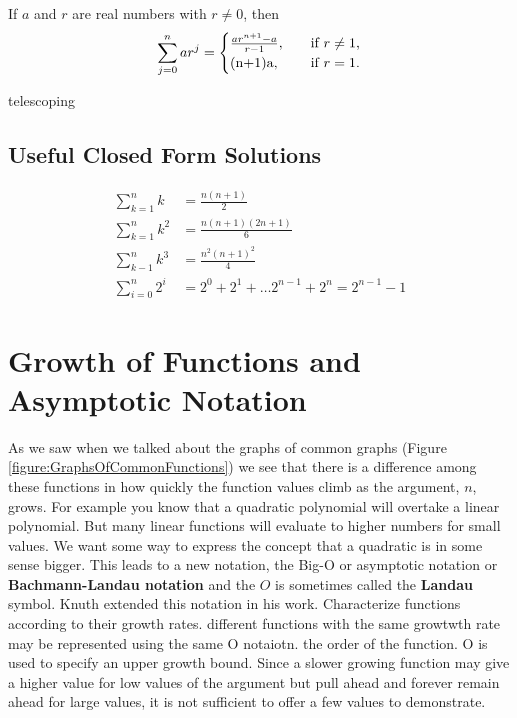 \begin{theorem}
If $a$ and $r$ are real numbers with $r\ne 0$, then
\[   
\sum_{j=0}^n ar^j  = 
     \begin{cases}
       \frac{ar^{n+1}-a}{r-1}, &\quad\text{if $r \ne 1$,}\\ 
       $(n+1)a$,               &\quad\text{if $r=1$.} \\
     \end{cases}
\]
\end{theorem}

telescoping

\subsection{Useful Closed Form Solutions}
\begin{align}
\sum_{k=1}^n k & = \frac{n(n+1)}{2}\\
\sum_{k=1}^n k^2 & =\frac{n(n+1)(2n+1)}{6}\\
\sum_{k-1}^n k^3 & =\frac{n^2(n+1)^2}{4}\\
\sum_{i=0}^n 2^i & = 2^0+2^1+\dots 2^{n-1}+2^n= 2^{n-1} -1
\end{align}


\section {Growth of Functions and Asymptotic Notation}
As we saw when we talked about the graphs of common graphs  (Figure \ref{figure:GraphsOfCommonFunctions}) we see that there is a difference among these functions in how quickly the function values climb as the argument, $n$, grows. For example you know that a quadratic polynomial will overtake a linear polynomial. But many linear functions will evaluate to higher numbers for small values. We want some way to express the concept that a quadratic is in some sense bigger. This leads to a new notation, the Big-O or asymptotic notation or \textbf{Bachmann-Landau notation} and the $O$ is sometimes called the \textbf{Landau} symbol. Knuth extended this notation in his work.
Characterize functions according to their growth rates. different functions with the same growtwth rate may be represented using the same O notaiotn. the order of the function. O is used to specify an upper growth bound. Since a slower growing function may give a higher value for low values of the argument but pull ahead and forever remain ahead for large values, it is not sufficient to offer a few values to demonstrate. 

